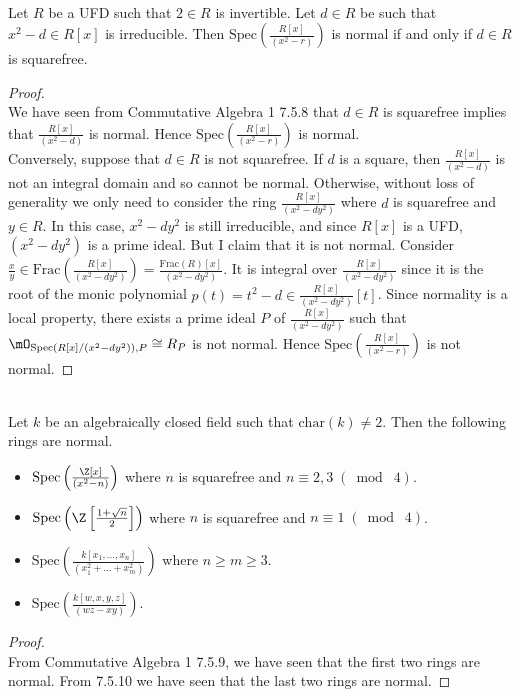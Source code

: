 \documentclass[a4paper]{article}
\begin{document}
\begin{eg}{}{}\\
Let $R$ be a UFD such that $2\in R$ is invertible. Let $d\in R$ be such that $x^2-d\in R[x]$ is irreducible. Then $\text{Spec}\left(\frac{R[x]}{(x^2-r)}\right)$ is normal if and only if $d\in R$ is squarefree. 
\begin{proof}\\
We have seen from Commutative Algebra 1 7.5.8 that $d\in R$ is squarefree implies that $\frac{R[x]}{(x^2-d)}$ is normal. Hence $\text{Spec}\left(\frac{R[x]}{(x^2-r)}\right)$ is normal. \\

Conversely, suppose that $d\in R$ is not squarefree. If $d$ is a square, then $\frac{R[x]}{(x^2-d)}$ is not an integral domain and so cannot be normal. Otherwise, without loss of generality we only need to consider the ring $\frac{R[x]}{(x^2-dy^2)}$ where $d$ is squarefree and $y\in R$. In this case, $x^2-dy^2$ is still irreducible, and since $R[x]$ is a UFD, $(x^2-dy^2)$ is a prime ideal. But I claim that it is not normal. Consider $\frac{x}{y}\in\text{Frac}\left(\frac{R[x]}{(x^2-dy^2)}\right)=\frac{\text{Frac}(R)[x]}{(x^2-dy^2)}$. It is integral over $\frac{R[x]}{(x^2-dy^2)}$ since it is the root of the monic polynomial $p(t)=t^2-d\in\frac{R[x]}{(x^2-dy^2)}[t]$. Since normality is a local property, there exists a prime ideal $P$ of $\frac{R[x]}{(x^2-dy^2)}$ such that $\mO_{\text{Spec}(R[x]/(x^2-dy^2)),P}\cong R_P$ is not normal. Hence $\text{Spec}\left(\frac{R[x]}{(x^2-r)}\right)$ is not normal. 
\end{proof}
\end{eg}

\begin{eg}{}{}\\
Let $k$ be an algebraically closed field such that $\text{char}(k)\neq 2$. Then the following rings are normal. 
\begin{itemize}
\item $\text{Spec}\left(\frac{\Z[x]}{(x^2-n)}\right)$ where $n$ is squarefree and $n\equiv2,3\;(\bmod\;4)$. 
\item $\text{Spec}\left(\Z\left[\frac{1+\sqrt{n}}{2}\right]\right)$ where $n$ is squarefree and $n\equiv1\;(\bmod\;4)$. 
\item $\text{Spec}\left(\frac{k[x_1,\dots,x_n]}{(x_1^2+\dots+x_m^2)}\right)$ where $n\geq m\geq 3$. 
\item $\text{Spec}\left(\frac{k[w,x,y,z]}{(wz-xy)}\right)$. 
\end{itemize}
\begin{proof}\\
From Commutative Algebra 1 7.5.9, we have seen that the first two rings are normal. From 7.5.10 we have seen that the last two rings are normal. 
\end{proof}
\end{eg}
\end{document}
